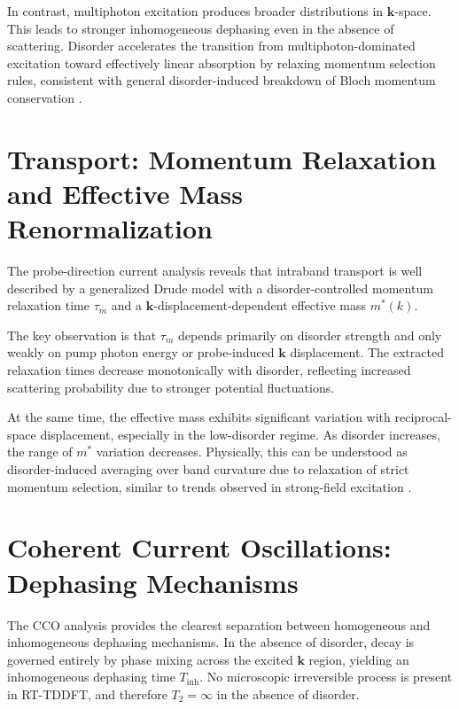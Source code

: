 In contrast, multiphoton excitation produces broader distributions in $\mathbf{k}$-space. This leads to stronger inhomogeneous dephasing even in the absence of scattering. Disorder accelerates the transition from multiphoton-dominated excitation toward effectively linear absorption by relaxing momentum selection rules, consistent with general disorder-induced breakdown of Bloch momentum conservation \cite{Sheng2006Localization}.

\section*{Transport: Momentum Relaxation and Effective Mass Renormalization}

The probe-direction current analysis reveals that intraband transport is well described by a generalized Drude model with a disorder-controlled momentum relaxation time $\tau_m$ and a $\mathbf{k}$-displacement-dependent effective mass $m^*(k)$. 

The key observation is that $\tau_m$ depends primarily on disorder strength and only weakly on pump photon energy or probe-induced $\mathbf{k}$ displacement. The extracted relaxation times decrease monotonically with disorder, reflecting increased scattering probability due to stronger potential fluctuations.


At the same time, the effective mass exhibits significant variation with reciprocal-space displacement, especially in the low-disorder regime. As disorder increases, the range of $m^*$ variation decreases. Physically, this can be understood as disorder-induced averaging over band curvature due to relaxation of strict momentum selection, similar to trends observed in strong-field excitation \cite{Qasim2018}.


\section*{Coherent Current Oscillations: Dephasing Mechanisms}

The CCO analysis provides the clearest separation between homogeneous and inhomogeneous dephasing mechanisms. In the absence of disorder, decay is governed entirely by phase mixing across the excited $\mathbf{k}$ region, yielding an inhomogeneous dephasing time $T_{\mathrm{inh}}$. No microscopic irreversible process is present in RT-TDDFT, and therefore $T_2=\infty$ in the absence of disorder.

